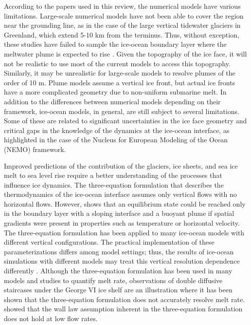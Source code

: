 \documentclass[11pt,a4paper]{article}
\begin{document}
    According to the papers used in this review, the numerical models have various limitations. Large-scale numerical models have not been able to cover the region near the grounding line, as in the case of the large vertical tidewater glaciers in Greenland, which extend 5-10 km from the terminus. Thus, without exception, these studies have failed to sample the ice-ocean boundary layer where the meltwater plume is expected to rise \citep{straneo2012characteristics}. Given the topography of the ice face, it will not be realistic to use most of the current models to access this topography. Similarly, it may be unrealistic for large-scale models to resolve plumes of the order of 10 m. Plume models assume a vertical ice front, but actual ice fronts have a more complicated geometry due to non-uniform submarine melt.
    In addition to the differences between numerical models depending on their framework, ice-ocean models, in general, are still subject to several limitations. Some of these are related to significant uncertainties in the ice face geometry and critical gaps in the knowledge of the dynamics at the ice-ocean interface, as \cite{mathiot2017explicit} highlighted in the case of the Nucleus for European Modeling of the Ocean (NEMO) framework.
    
    Improved predictions of the contribution of the glaciers, ice sheets, and sea ice melt to sea level rise require a better understanding of the processes that influence ice dynamics. The three-equation formulation that describes the thermodynamics of the ice-ocean interface assumes only vertical flows with no horizontal flows. However, \cite{jenkins2016simple} shows that an equilibrium state could be reached only in the boundary layer with a sloping interface and a buoyant plume if spatial gradients were present in properties such as temperature or horizontal velocity. The three-equation formulation has been applied to many ice-ocean models with different vertical configurations. The practical implementation of these parameterizations differs among model settings; thus, the results of ice-ocean simulations with different models may treat this vertical resolution dependence differently \citep{gwyther2020vertical}. Although the three-equation formulation has been used in many models and studies to quantify melt rate, observations of double diffusive staircases under the George VI ice shelf \citep{kimura2015estimation} are an illustration where it has been shown that the three-equation formulation does not accurately resolve melt rate. \cite{davis2019turbulence} showed that the wall law assumption inherent in the three-equation formulation does not hold at low flow rates.
    
\end{document}
